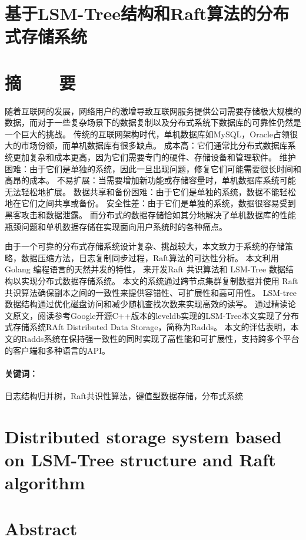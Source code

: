 \section*{基于LSM-Tree结构和Raft算法的分布式存储系统}
\section*{摘\ \ \ \ 要}

随着互联网的发展，网络用户的激增导致互联网服务提供公司需要存储极大规模的数据，而对于一些复杂场景下的数据复制以及分布式系统下数据库的可靠性仍然是一个巨大的挑战。
传统的互联网架构时代，单机数据库如MySQL，Oracle占领很大的市场份额，而单机数据库有很多缺点。
成本高：它们通常比分布式数据库系统更加复杂和成本更高，因为它们需要专门的硬件、存储设备和管理软件。
维护困难：由于它们是单独的系统，因此一旦出现问题，修复它们可能需要很长时间和高昂的成本。
不易扩展：当需要增加新功能或存储容量时，单机数据库系统可能无法轻松地扩展。
数据共享和备份困难：由于它们是单独的系统，数据不能轻松地在它们之间共享或备份。
安全性差：由于它们是单独的系统，数据很容易受到黑客攻击和数据泄露。
而分布式的数据存储恰如其分地解决了单机数据库的性能瓶颈问题和单机数据存储在实现面向用户系统时的各种痛点。


由于一个可靠的分布式存储系统设计复杂、挑战较大，本文致力于系统的存储策略，数据压缩方法，日志复制同步过程，Raft算法的可达性分析。
本文利用 Golang 编程语言的天然并发的特性， 来开发Raft 共识算法和 LSM-Tree 数据结构以实现分布式数据存储系统。 
本文的系统通过跨节点集群复制数据并使用 Raft 共识算法确保副本之间的一致性来提供容错性、可扩展性和高可用性。 
LSM-tree 数据结构通过优化磁盘访问和减少随机查找次数来实现高效的读写。 
通过精读论文原文，阅读参考Google开源C++版本的leveldb实现的LSM-Tree本文实现了分布式存储系统RAft Distributed Data Storage，简称为Radds。
本文的评估表明，本文的Radds系统在保持强一致性的同时实现了高性能和可扩展性，支持跨多个平台的客户端和多种语言的API。

\paragraph{关键词：} 日志结构归并树，Raft共识性算法，键值型数据存储，分布式系统

\clearpage


\section*{Distributed storage system based on LSM-Tree structure and Raft algorithm}

\section*{Abstract}

